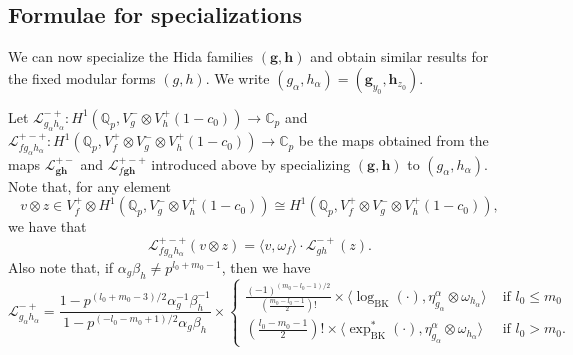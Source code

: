 \documentclass[a4paper,11pt]{amsart}
\theoremstyle{plain}
\theoremstyle{definition}
\theoremstyle{remark}
\newtheorem{remarkwr}[theorem]{Remark}
\newenvironment{remark}{\begin{remarkwr}\begin{upshape}}{\end{upshape}\end{remarkwr}}
\newcommand{\bb}{\mathbb}
\newcommand{\cl}{\mathcal}
\DeclareMathOperator{\BK}{BK}
\DeclareMathOperator{\BF}{BF}
\newcommand{\Lp}{{\mathscr{L}_p}}
\newcommand{\hg}{{\mathbf{g}}}
\newcommand{\hh}{{\mathbf h}}
\newcommand{\res}{\mathrm{res}}
\numberwithin{equation}{section}
\begin{document}

\subsection{Formulae for specializations}\label{subsec:nonexceptional}


We can now specialize the Hida families $(\hg,\hh)$ and obtain similar results for the fixed modular forms $(g,h)$. We write $(g_\alpha,h_\alpha)=(\hg_{y_0},\hh_{z_0})$.

Let $\cl{L}_{g_\alpha h_\alpha}^{-+}:H^1(\bb{Q}_p,V_g^-\otimes V_h^+(1-c_0))\rightarrow \bb{C}_p$ and $\cl{L}_{fg_\alpha h_\alpha}^{+-+}:H^1(\bb{Q}_p,V_f^+\otimes V_g^-\otimes V_h^+(1-c_0))\rightarrow \bb{C}_p$ be the maps obtained from the maps $\cl{L}_{\hg\hh}^{+-}$ and $\cl{L}_{f\hg\hh}^{+-+}$ introduced above by specializing $(\hg,\hh)$ to $(g_\alpha,h_\alpha)$. Note that, for any element
\[
v\otimes z \in V_f^+ \otimes H^1(\bb{Q}_p,V_g^-\otimes V_h^+(1-c_0))\cong H^1(\bb{Q}_p,V_f^+\otimes V_g^-\otimes V_h^+(1-c_0)),
\]
we have that
\[
\mathcal{L}_{fg_\alpha h_\alpha}^{+-+}(v\otimes z)=\langle v,\omega_f\rangle \cdot\mathcal{L}_{gh}^{-+}(z).
\]
Also note that, if $\alpha_g \beta_h\neq p^{l_0+m_0-1}$, then we have
\[
\cl{L}_{g_\alpha h_\alpha}^{-+}= \frac{1-p^{(l_0+m_0-3)/2} \alpha_{g}^{-1} \beta_{h}^{-1}}{1-p^{(-l_0-m_0+1)/2} \alpha_{g} \beta_{h}} \times \begin{cases} \frac{(-1)^{(m_0-l_0-1)/2}}{\left(\frac{m_0-l_0-1}{2}\right)!} \times \langle \log_{\BK}(\cdot), \eta_{g_\alpha}^\alpha \otimes \omega_{h_\alpha} \rangle & \text{ if } l_0 \leq m_0 \\ \left(\frac{l_0-m_0-1}{2}\right)! \times \langle \exp_{\BK}^*(\cdot), \eta_{g_\alpha}^\alpha \otimes \omega_{h_\alpha} \rangle & \text{ if } l_0 > m_0. \end{cases}
\]
\end{document}

